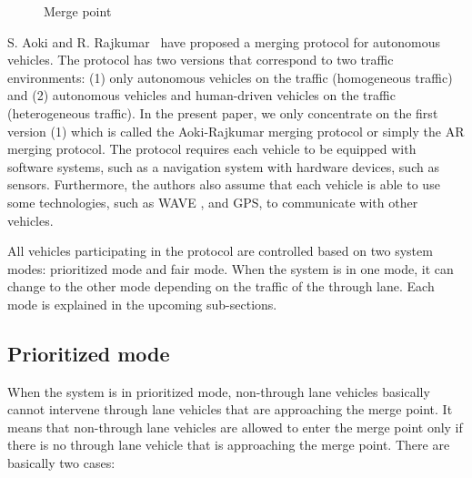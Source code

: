 \documentclass[10pt, conference, compsocconf]{IEEEtran}
\begin{document}
\begin{figure}[t]
\begin{center}
\end{center}
\caption{Merge point}
\label{mergePoint_fig}
\end{figure}

S. Aoki and R. Rajkumar~\cite{10.1145/3055004.3055028} have proposed a
merging protocol for autonomous vehicles. The protocol has two
versions that correspond to two traffic environments: (1) only
autonomous vehicles on the traffic (homogeneous traffic) and (2)
autonomous vehicles and human-driven vehicles on the traffic
(heterogeneous traffic).  In the present paper, we only concentrate on
the first version (1) which is called the Aoki-Rajkumar merging
protocol or simply the AR merging protocol.  The protocol requires
each vehicle to be equipped with software systems, such as a
navigation system with hardware devices, such as sensors.  Furthermore,
the authors also assume that each vehicle is able to use some
technologies, such as WAVE \cite{4346439,5888501}, and GPS, to
communicate with other vehicles.

All vehicles participating in the protocol are controlled based on two
system modes: prioritized mode and fair mode.  When the system is in
one mode, it can change to the other mode depending on the traffic of
the through lane. Each mode is explained in the upcoming sub-sections.

\subsection{Prioritized mode}

When the system is in prioritized mode, non-through lane vehicles
basically cannot intervene through lane vehicles that are approaching
the merge point.  It means that non-through lane vehicles are allowed
to enter the merge point only if there is no through lane vehicle that
is approaching the merge point.  There are basically two cases:
\end{document}
